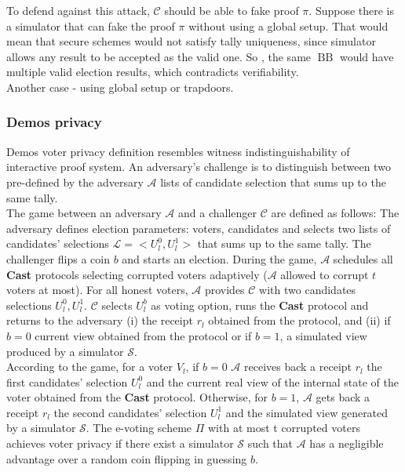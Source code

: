 \documentclass[12pt]{article}
\DeclareMathOperator{\bb}{BB}
\begin{document}
To defend against this attack, $\mathcal{C}$ should be able to fake proof $\pi$. Suppose there is a simulator that can fake the proof $\pi$ without using a global setup. That would mean that secure schemes would not satisfy tally uniqueness, since simulator allows any result to be accepted as the valid one. So , the same $\bb$ would have multiple valid election results, which contradicts verifiability. \\ 

Another case - using global setup or trapdoors. 

 \subsubsection{Demos privacy}
 Demos voter privacy definition resembles witness indistinguishability of interactive proof system. An adversary's challenge is to distinguish between two pre-defined by the adversary  $\mathcal{A}$ lists of candidate selection that sums up to the same tally. \\
 
 The game between an adversary $\mathcal{A}$ and a challenger $\mathcal{C}$ are defined as follows: The adversary defines election parameters: voters, candidates and selects two lists of candidates' selections $\mathcal{L} = <U_l^0, U_l^1>$  that sums up to the same tally. The challenger flips a coin $b$ and starts an election. During the game,   $\mathcal{A}$ schedules all \textbf{Cast} protocols selecting corrupted voters adaptively ($\mathcal{A}$ allowed to corrupt $t$ voters at most). For all honest voters,  $\mathcal{A}$ provides $\mathcal{C}$ with two candidates selections $U_l^0, U_l^1$. $\mathcal{C}$ selects $U_l^b$ as voting option, runs the \textbf{Cast}  protocol and returns to the adversary (i) the receipt $r_l$ obtained from the protocol, and (ii) if $b = 0$ current view obtained from the protocol or if $b =1$, a simulated view produced by a simulator $\mathcal{S}$. \\
 
 According to the game, for a voter $V_l$, if $b = 0$ $\mathcal{A}$ receives back a receipt $r_l$ the first candidates' selection $U_l^0$ and the current real view of the internal state of the voter obtained from the \textbf{Cast} protocol. Otherwise, for $b = 1$,  $\mathcal{A}$ gets back a receipt $r_l$ the second candidates' selection $U_l^1$ and the simulated view generated by a simulator $\mathcal{S}$. The e-voting scheme $\Pi$ with at most t corrupted voters achieves voter privacy if there exist a simulator $\mathcal{S}$ such that $\mathcal{A}$  has a negligible advantage over a random coin flipping in guessing $b$.\\
 
\end{document}

